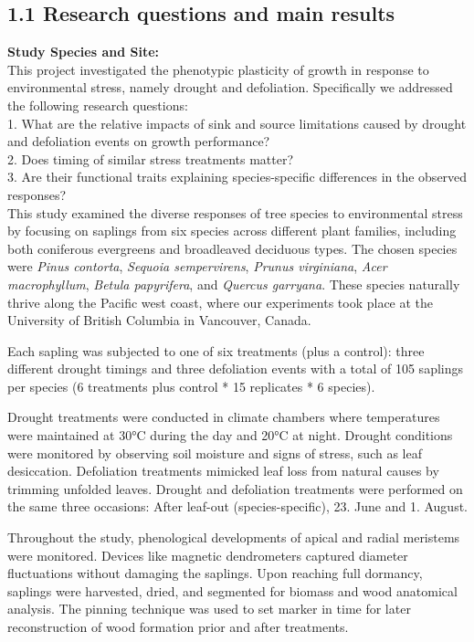 \documentclass{article}
\begin{document}
	\subsection*{1.1 Research questions and main results}
	\textbf{Study Species and Site:} \\
	This project investigated the phenotypic plasticity of growth in response to environmental stress, namely drought and defoliation. Specifically we addressed the following research questions:\\
	
	1. What are the relative impacts of sink and source limitations caused by drought and defoliation events on growth performance?\\
	2. Does timing of similar stress treatments matter?\\
	3. Are their functional traits explaining species-specific differences in the observed responses?\\
	
	This study examined the diverse responses of tree species to environmental stress by focusing on saplings from six species across different plant families, including both coniferous evergreens and broadleaved deciduous types. The chosen species were \textit{Pinus contorta}, \textit{Sequoia sempervirens}, \textit{Prunus virginiana}, \textit{Acer macrophyllum}, \textit{Betula papyrifera}, and \textit{Quercus garryana}. These species naturally thrive along the Pacific west coast, where our experiments took place at the University of British Columbia in Vancouver, Canada. 
	
	Each sapling was subjected to one of six treatments (plus a control): three different drought timings and three defoliation events with a total of 105 saplings per species (6 treatments plus control * 15 replicates * 6 species). 
	
	Drought treatments were conducted in climate chambers where temperatures were maintained at 30°C during the day and 20°C at night. Drought conditions were monitored by observing soil moisture and signs of stress, such as leaf desiccation. Defoliation treatments mimicked leaf loss from natural causes by trimming unfolded leaves. Drought and defoliation treatments were performed on the same three occasions: After leaf-out (species-specific), 23. June and 1. August.  
	
	Throughout the study, phenological developments of apical and radial meristems were monitored. Devices like magnetic dendrometers captured diameter fluctuations without damaging the saplings. Upon reaching full dormancy, saplings were harvested, dried, and segmented for biomass and wood anatomical analysis. The pinning technique was used to set marker in time for later reconstruction of wood formation prior and after treatments. 	\\
	
\end{document}
